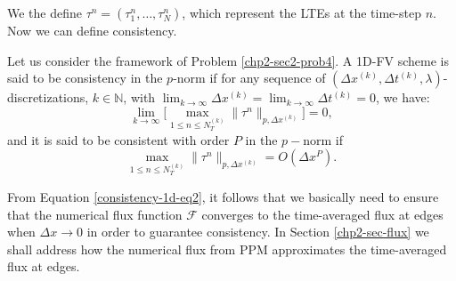 We the define $\tau^n = (\tau_1^n, \ldots, \tau^n_N)$, which represent the LTEs at the time-step $n$.
Now we can define consistency.
\begin{definition}[Consistency]
	\label{chp2-def-cons}
	Let us consider the framework of Problem \ref{chp2-sec2-prob4}.
	A 1D-FV scheme is said to be consistency in the $p$-norm if for any sequence of $(\Delta x^{(k)}, \Delta t^{(k)},\lambda)$-discretizations, 
	$k \in \mathbb{N}$, with $\lim_{k\to \infty }{\Delta x^{(k)}} = \lim_{k\to \infty }{\Delta t^{(k)}} = 0$, we have:
	\begin{equation*}
		\lim_{k \to \infty}\bigg[ {\max_{1\leq n\leq N_T^{(k)}}}{\|\tau^n\|_{p,\Delta x^{(k)}}} \bigg] = 0,
	\end{equation*}
	and it is said to be consistent with order $P$ in the $p-$norm if %
	\begin{equation*}
		{\max_{1\leq n\leq N_T^{(k)}}}{\|\tau^n\|_{p,\Delta x^{(k)}}} = O(\Delta x^P).
	\end{equation*}
\end{definition}
From Equation \eqref{consistency-1d-eq2}, it follows that we basically need to ensure that 
the numerical flux function $\mathcal{F}$ converges to the time-averaged flux at edges
when $\Delta x \to 0$ in order to guarantee consistency.
In Section \ref{chp2-sec-flux} we shall address how the numerical flux from PPM
approximates the time-averaged flux at edges.

